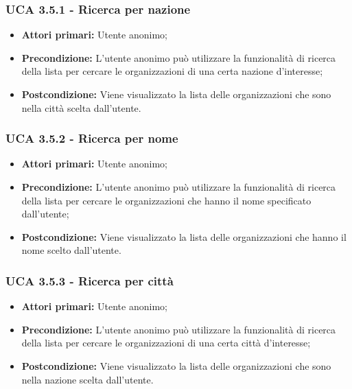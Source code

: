 \subsubsection{UCA 3.5.1 - Ricerca per nazione}%
\begin{itemize}
	\item \textbf{Attori primari:} Utente anonimo;
	\item \textbf{Precondizione:} L'utente anonimo può utilizzare la funzionalità di ricerca della lista per cercare le organizzazioni di una certa nazione d'interesse;
	\item \textbf{Postcondizione:} Viene visualizzato la lista delle organizzazioni che sono nella città scelta dall'utente.
\end{itemize}

\subsubsection{UCA 3.5.2 - Ricerca per nome}%
\begin{itemize}
	\item \textbf{Attori primari:} Utente anonimo;
	\item \textbf{Precondizione:} L'utente anonimo può utilizzare la funzionalità di ricerca della lista per cercare le organizzazioni che hanno il nome specificato dall'utente;
	\item \textbf{Postcondizione:} Viene visualizzato la lista delle organizzazioni che hanno il nome scelto dall'utente.
\end{itemize}

\subsubsection{UCA 3.5.3 - Ricerca per città}%
\begin{itemize}
	\item \textbf{Attori primari:} Utente anonimo;
	\item \textbf{Precondizione:} L'utente anonimo può utilizzare la funzionalità di ricerca della lista per cercare le organizzazioni di una certa città d'interesse;
	\item \textbf{Postcondizione:} Viene visualizzato la lista delle organizzazioni che sono nella nazione scelta dall'utente.
\end{itemize}

